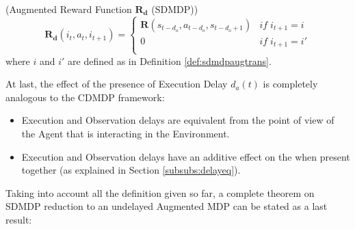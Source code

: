                 \begin{definition}(Augmented Reward Function $\mathbf{R_d}$ (SDMDP))
                    \label{def:sdmdpaugrew}
                    \[ \mathbf{R_d} \left( i_t, a_t, i_{t+1} \right) =  
                        \begin{cases} 
                            \mathbf{R} \left( s_{t-d_o}, a_{t-d_o}, s_{t-d_o+1} \right) & if \; i_{t+1} = i \\
                            0 & if \; i_{t+1} = i'\\ 
                        \end{cases}
                    \]
                where $i$ and $i'$ are defined as in Definition \ref{def:sdmdpaugtrans}.
                \end{definition}
                \noindent
                At last, the effect of the presence of Execution Delay $d_a(t)$ is completely analogous to the CDMDP framework: 
                \begin{itemize}[topsep=0.5em, partopsep=0.5em]
                    \setlength\itemsep{0em}
                    \item Execution and Observation delays are equivalent from the point of view of the Agent that is interacting in the Environment.
                    \item Execution and Observation delays have an additive effect on the when present together (as explained in Section \ref{subsubs:delayeq}).
                \end{itemize}
                Taking into account all the definition given so far, a complete theorem on SDMDP reduction to an undelayed Augmented MDP can be stated as a last result:
